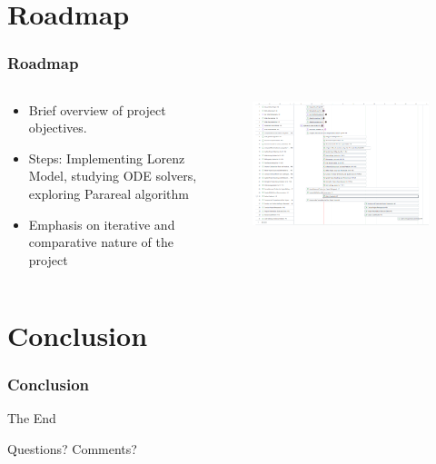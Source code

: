 \documentclass[
	11pt,
]{beamer}
\begin{document}
\section{Roadmap}
\begin{frame}
    \frametitle{Roadmap}
	\begin{columns}[c]
		\begin{column}{0.5\textwidth}
			\begin{itemize}
				\item Brief overview of project objectives.
				\item Steps: Implementing Lorenz Model, studying ODE solvers, exploring Parareal algorithm
				\item Emphasis on iterative and comparative nature of the project
			\end{itemize}
		\end{column}
		\begin{column}{0.5\textwidth}
			\begin{figure}
				\includegraphics[width=1\linewidth]{roadmap.png}
			\end{figure}
		\end{column}
	\end{columns}
\end{frame}


\section{Conclusion}

\begin{frame}
	\frametitle{Conclusion}
	\begin{center}
		{\Huge The End}

		\bigskip\bigskip

		{\LARGE Questions? Comments?}
	\end{center}
\end{frame}

\end{document}
